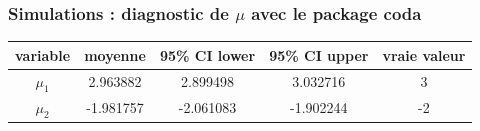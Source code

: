 \begin{frame}
    \frametitle{Simulations : diagnostic de $\mu$ avec le package coda}

    \begin{table}[]
        \begin{tabular}{ccccc}
        \hline
        \multicolumn{1}{|l|}{variable} & \multicolumn{1}{l|}{moyenne} & \multicolumn{1}{l|}{95\% CI lower} & \multicolumn{1}{l|}{95\% CI upper} & \multicolumn{1}{l|}{vraie valeur} \\ \hline
        $\mu_1$                        & 2.963882                     & 2.899498                           & 3.032716                           & 3                                 \\ \hline
        $\mu_2$                        & -1.981757                    & -2.061083                          & -1.902244                          & -2                                \\ \hline
        \end{tabular}
        \end{table}
\end{frame}





